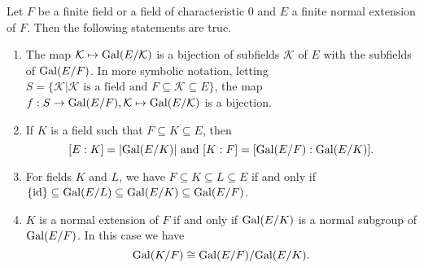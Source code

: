 \begin{theorem}\label{thrm-fundamental-theorem-of-galois-theory}
    Let $F$ be a finite field or a field of characteristic 0 and $E$ a finite normal extension of $F$. Then the following statements are true.
    \begin{enumerate}
        \item The map $\mathcal{K} \mapsto \mathrm{Gal}(E/\mathcal{K})$ is a bijection of subfields $\mathcal{K}$ of $E$ with the subfields of $\mathrm{Gal}(E/F)$. In more symbolic notation, letting $S = \{\mathcal{K} \vert \mathcal{K} \text{ is a field and } F \subseteq \mathcal{K} \subseteq E\}$, the map $f: S \to \mathrm{Gal}(E/F), \mathcal{K} \mapsto \mathrm{Gal}(E/\mathcal{K})$ is a bijection.
        
        \item If $K$ is a field such that $F \subseteq K \subseteq E$, then
        \[
            [E:K] = |\mathrm{Gal}(E/K)| \text{ and } [K:F] = [\mathrm{Gal}(E/F):\mathrm{Gal}(E/K)].
        \]

        \item For fields $K$ and $L$, we have $F \subseteq K \subseteq L \subseteq E$ if and only if $\{\mathrm{id}\} \subseteq \mathrm{Gal}(E/L) \subseteq \mathrm{Gal}(E/K) \subseteq \mathrm{Gal}(E/F)$.
        
        \item $K$ is a normal extension of $F$ if and only if $\mathrm{Gal}(E/K)$ is a normal subgroup of $\mathrm{Gal}(E/F)$. In this case we have
        \[
            \mathrm{Gal}(K/F) \cong \mathrm{Gal}(E/F)/\mathrm{Gal}(E/K).
        \]
    \end{enumerate}
\end{theorem}
